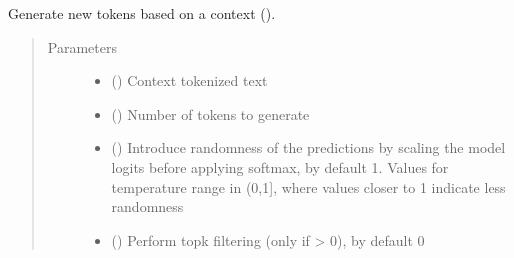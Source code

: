\documentclass[letterpaper,10pt,english]{sphinxmanual}
\begin{document}
\begin{fulllineitems}
\begin{fulllineitems}
\end{fulllineitems}


\begin{fulllineitems}
\label{\detokenize{code:gpt2_summarizer.GPT2Summarizer.sample_sequence}}
\sphinxAtStartPar
Generate  new tokens based on a context ().
\begin{quote}\begin{description}
\item[{Parameters}] \leavevmode\begin{itemize}
\item {} 
\sphinxAtStartPar
{} () \textendash{} Context tokenized text

\item {} 
\sphinxAtStartPar
{} () \textendash{} Number of tokens to generate

\item {} 
\sphinxAtStartPar
{} (\sphinxstyleliteralemphasis{\sphinxupquote{, }}) \textendash{} Introduce randomness of the predictions by scaling the model logits before
applying softmax, by default 1. Values for temperature range in (0,1{]}, where
values closer to 1 indicate less randomness

\item {} 
\sphinxAtStartPar
{} (\sphinxstyleliteralemphasis{\sphinxupquote{, }}) \textendash{} Perform top\sphinxhyphen{}k filtering (only if  \textgreater{} 0), by default 0


\end{itemize}
\end{description}
\end{quote}
\end{fulllineitems}
\end{fulllineitems}
\end{document}
